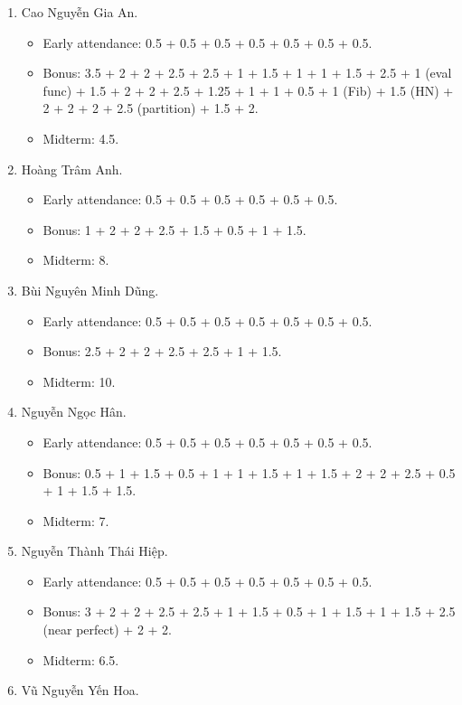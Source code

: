 \documentclass{article}
\begin{document}
\begin{enumerate}
	\item {\sc Cao Nguyễn Gia An.}
	\begin{itemize}
		\item Early attendance: 0.5 + 0.5 + 0.5 + 0.5 + 0.5 + 0.5 + 0.5.
		\item Bonus: 3.5 + 2 + 2 + 2.5 + 2.5 + 1 + 1.5 + 1 + 1 + 1.5 + 2.5 + 1 (eval func) + 1.5 + 2 + 2 + 2.5 + 1.25 + 1 + 1 + 0.5 + 1 (Fib) + 1.5 (HN) + 2 + 2 + 2 + 2.5 (partition) + 1.5 + 2.
        \item Midterm: 4.5.
	\end{itemize}
	\item {\sc Hoàng Trâm Anh.}
	\begin{itemize}
		\item Early attendance: 0.5 + 0.5 + 0.5 + 0.5 + 0.5 + 0.5.
		\item Bonus: 1 + 2 + 2 + 2.5 + 1.5 + 0.5 + 1 + 1.5.
        \item Midterm: 8.
	\end{itemize}
	\item {\sc Bùi Nguyên Minh Dũng.}
	\begin{itemize}
		\item Early attendance: 0.5 + 0.5 + 0.5 + 0.5 + 0.5 + 0.5 + 0.5.
		\item Bonus: 2.5 + 2 + 2 + 2.5 + 2.5 + 1 + 1.5.
        \item Midterm: 10.
	\end{itemize}
	\item {\sc Nguyễn Ngọc Hân.}
	\begin{itemize}
		\item Early attendance: 0.5 + 0.5 + 0.5 + 0.5 + 0.5 + 0.5 + 0.5.
		\item Bonus: 0.5 + 1 + 1.5 + 0.5 + 1 + 1 + 1.5 + 1 + 1.5 + 2 + 2 + 2.5 + 0.5 + 1 + 1.5 + 1.5.
        \item Midterm: 7.
	\end{itemize}
	\item {\sc Nguyễn Thành Thái Hiệp.}
	\begin{itemize}
		\item Early attendance: 0.5 + 0.5 + 0.5 + 0.5 + 0.5 + 0.5 + 0.5.
		\item Bonus: 3 + 2 + 2 + 2.5 + 2.5 + 1 + 1.5 + 0.5 + 1 + 1.5 + 1 + 1.5 + 2.5 (near perfect) + 2 + 2.
        \item Midterm: 6.5.
	\end{itemize}
	\item {\sc Vũ Nguyễn Yến Hoa.}

\end{enumerate}
\end{document}
